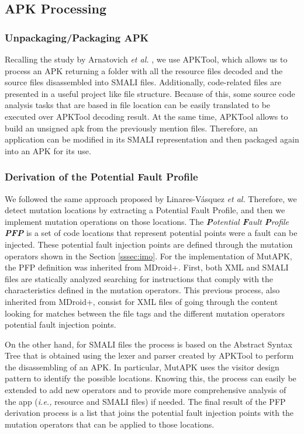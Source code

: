 \subsection{APK Processing}
\subsubsection{Unpackaging/Packaging APK}

Recalling the study by Arnatovich \textit{et al.} \cite{arnatovich2018comparison}, we use APKTool, which allows us to process an APK returning a folder with all the resource files decoded and the source files disassembled into SMALI files. Additionally, code-related files are presented in a useful project like file structure. Because of this, some source code analysis tasks that are based in file location can be easily translated to be executed over APKTool decoding result. At the same time, APKTool allows to build an unsigned apk from the previously mention files. Therefore, an application can be modified in its SMALI representation and then packaged again into an APK for its use.

\subsubsection{Derivation of the Potential Fault Profile}

We followed the same approach proposed by Linares-V\'asquez \emph{et al.} \cite{linares2017enabling,Moran:ICSE18} Therefore, we detect mutation locations by extracting a Potential Fault Profile, and then we implement mutation operations on those locations. The \textit{\textbf{P}otential \textbf{F}ault \textbf{P}rofile \textbf{PFP}} is a set of code locations that represent potential points were a fault can be injected. These potential fault injection points are defined through the mutation operators shown in the Section \ref{sssec:imo}. For the implementation of MutAPK, the PFP definition was inherited from MDroid+. First, both XML and SMALI files are statically analyzed searching for instructions that comply with the characteristics defined in the mutation operators. This previous process, also inherited from MDroid+, consist for XML files of going through the content looking for matches between the file tags and the different mutation operators potential fault injection points. 

On the other hand, for SMALI files the process is based on the Abstract Syntax Tree that is obtained using the lexer and parser created by APKTool to perform the disassembling of an APK. In particular, MutAPK uses the visitor design pattern  to identify the possible locations. Knowing this, the process can easily be extended to add new operators and to provide more comprehensive analysis of the app (\textit{i.e.,} resource and SMALI files) if needed. The final result of the PFP derivation process is a list that joins the potential fault injection points with the mutation operators that can be applied to those locations.
